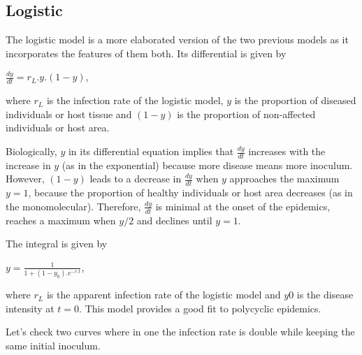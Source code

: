 \documentclass[
  letterpaper,
  DIV=11,
  numbers=noendperiod]{scrreprt}
\begin{document}
\hypertarget{logistic}{%
\subsection{Logistic}\label{logistic}}

The logistic model is a more elaborated version of the two previous
models as it incorporates the features of them both. Its differential is
given by

\(\frac{dy}{dt} = r_L. y . (1 - y)\),

where \(r_L\) is the infection rate of the logistic model, \(y\) is the
proportion of diseased individuals or host tissue and \((1-y)\) is the
proportion of non-affected individuals or host area.

Biologically, \(y\) in its differential equation implies that
\(\frac{dy}{dt}\) increases with the increase in \(y\) (as in the
exponential) because more disease means more inoculum. However,
\((1-y)\) leads to a decrease in \(\frac{dy}{dt}\) when \(y\) approaches
the maximum \(y=1\), because the proportion of healthy individuals or
host area decreases (as in the monomolecular). Therefore,
\(\frac{dy}{dt}\) is minimal at the onset of the epidemics, reaches a
maximum when \(y/2\) and declines until \(y=1\).

The integral is given by

\(y = \frac{1}{1 + (1-y_0).e^{-r.t}}\),

where \(r_L\) is the apparent infection rate of the logistic model and
\(y0\) is the disease intensity at \(t=0\). This model provides a good
fit to polycyclic epidemics.

Let's check two curves where in one the infection rate is double while
keeping the same initial inoculum.
\end{document}
